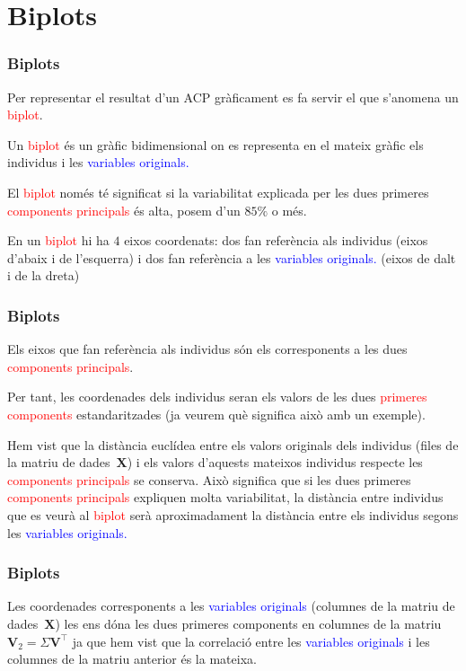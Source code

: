 \documentclass[12pt,t]{beamer}
\newcommand{\red}[1]{\textcolor{red}{#1}}
\newcommand{\blue}[1]{\textcolor{blue}{#1}}
\theoremstyle{plain}
\theoremstyle{definition}
\begin{document}
\section{Biplots}
\begin{frame}
\frametitle{Biplots}
Per representar el resultat d'un ACP gràficament es fa servir el que s'anomena un \red{biplot}. 
\medskip

Un \red{biplot} és un gràfic bidimensional on es representa en el mateix gràfic els individus i les \blue{variables originals.}
\medskip

El \red{biplot} només té significat si la variabilitat explicada per les dues primeres \red{components principals} és alta, posem d'un $85\%$ o més. 
\medskip

En un \red{biplot} hi ha $4$ eixos coordenats: dos fan referència als individus (eixos d'abaix i de l'esquerra) i dos fan referència a les \blue{variables originals.} (eixos de dalt i de la dreta)
\end{frame}

\begin{frame}
\frametitle{Biplots}
Els eixos que fan referència als individus són els corresponents a les dues \red{components principals}.
\medskip

Per tant, les coordenades dels individus seran els valors de les dues \red{primeres components} estandaritzades (ja veurem què significa això amb un exemple).
\medskip

Hem vist que la distància euclídea entre els valors originals dels individus (files de la matriu de dades~$\mathbf{X}$) i els valors d'aquests mateixos individus respecte les \red{components principals} se conserva. Això significa que si les dues primeres \red{components principals} expliquen molta variabilitat, la distància entre individus que es veurà al \red{biplot} serà aproximadament la distància entre els individus segons les \blue{variables originals.}
\medskip

\end{frame}


\begin{frame}
\frametitle{Biplots}

Les coordenades corresponents a les \blue{variables originals} (columnes de la matriu de dades~$\mathbf{X}$) les ens dóna les dues primeres components en columnes de la matriu $\mathbf{V}_2 = \Sigma\mathbf{V}^\top$ ja que hem vist que la correlació entre les \blue{variables originals} i les columnes de la matriu anterior és la mateixa.

\end{frame}
\end{document}
